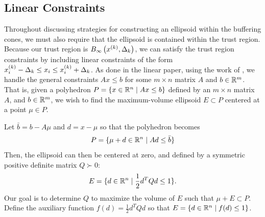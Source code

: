 \subsection{Linear Constraints}
\label{handling_linear_constraints_within_ellipsoid_programs}

Throughout discussing strategies for constructing an ellipsoid within the buffering cones, we must also require that the ellipsoid is contained within the trust region.
Because our trust region is ${ B_{\infty}\left(x^{(k)}, \Delta_k\right) }$, we can satisfy the trust region constraints by including linear constraints of the form $x^{(k)}_i - \Delta_k \le x_i \le x^{(k)}_i + \Delta_k$.
As done in the linear paper, using the work of \cite{Khachiyan1993}, we handle the general constraints $Ax \le b$ for some $m\times n$ matrix $A$ and $b \in \mathbb R^m$.
That is, given a polyhedron $P = \{ x \in \mathbb R^n\; | \;  Ax \le b \}$ defined by an $m \times n$ matrix $A$, and $b \in \mathbb R^m$,
we wish to find the maximum-volume ellipsoid $E \subset P$ centered at a point $\mu \in P$.

Let $\bar{b} = b - A\mu$ and $d = x - \mu$ so that the polyhedron becomes
\begin{align*}
P = \{ \mu + d \in \mathbb R^n \; | \;  Ad \le \bar{b} \}
\end{align*}
Then, the ellipsoid can then be centered at zero, and defined by a symmetric positive definite matrix $Q \succ 0$:
\begin{align*}
E = \{ d \in \mathbb R^n \; | \; \frac 1 2 d^T Q d \le 1 \}.
\end{align*}
Our goal is to determine $Q$ to maximize the volume of $E$ such that $\mu + E \subset P$.
Define the auxiliary function $f(d) = \frac 1 2 d^T Q d$ so that $E = \{ d \in \mathbb R^n\; | \; f(d) \le 1 \}$.

